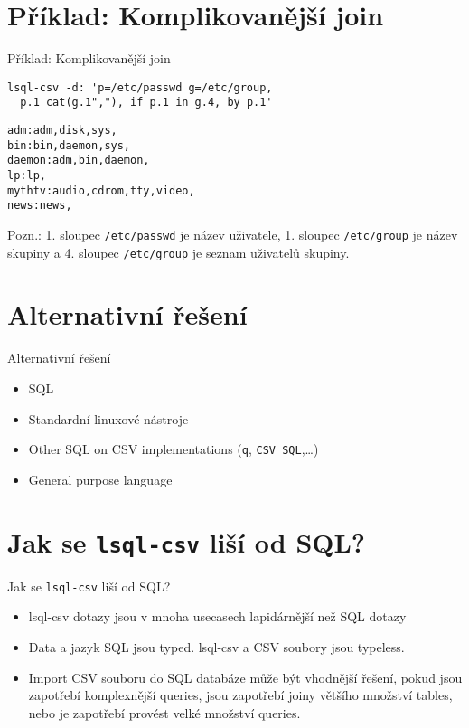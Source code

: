\documentclass{beamer}
\def\icode#1{\texttt{#1}}
\begin{document}
\section{Příklad: Komplikovanější join}
\begin{frame}[fragile]{Příklad: Komplikovanější join}
\begin{verbatim}
lsql-csv -d: 'p=/etc/passwd g=/etc/group, 
  p.1 cat(g.1","), if p.1 in g.4, by p.1'
\end{verbatim}

\begin{verbatim}
adm:adm,disk,sys,
bin:bin,daemon,sys,
daemon:adm,bin,daemon,
lp:lp,
mythtv:audio,cdrom,tty,video,
news:news,
\end{verbatim}

\vskip 1cm

Pozn.: 1. sloupec \icode{/etc/passwd} je název uživatele, 1. sloupec \icode{/etc/group} je název skupiny a 
4. sloupec \icode{/etc/group} je seznam uživatelů skupiny.

\end{frame}

\section{Alternativní řešení}
\begin{frame}[fragile]{Alternativní řešení}
\begin{itemize}
\item SQL
\item Standardní linuxové nástroje
\item Other SQL on CSV implementations (\icode{q}, \icode{CSV SQL},\ldots)
\item General purpose language
\end{itemize}
\end{frame}
		

\section{Jak se \icode{lsql-csv} liší od SQL?}
\begin{frame}[fragile]{Jak se \icode{lsql-csv} liší od SQL?}
\begin{itemize}
\item lsql-csv dotazy jsou v mnoha usecasech lapidárnější než SQL dotazy
\item Data a jazyk SQL jsou typed. lsql-csv a CSV soubory jsou typeless.
\item Import CSV souboru do SQL databáze může být vhodnější řešení, 
  pokud jsou zapotřebí komplexnější queries, jsou zapotřebí joiny většího množství tables, 
  nebo je zapotřebí provést velké množství queries.
\end{itemize}
\end{frame}
\end{document}
